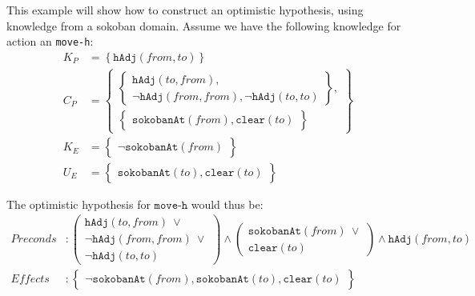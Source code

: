 \documentclass[../Master.tex]{subfiles}
\begin{document}
	\begin{example}
		This example will show how to construct an optimistic hypothesis, using knowledge from a sokoban domain.
		Assume we have the following knowledge for action an \texttt{move-h}:
		 	\begin{equation*}
			 	\begin{split}
				 	K_P & = \left\{\texttt{hAdj}(from, to) \right\} \\
					C_P& =	\left\{
							\begin{gathered}
								\left\{
								\begin{gathered}
									\texttt{hAdj}(to, from), \\
									\neg\texttt{hAdj}(from, from), \neg\texttt{hAdj}(to, to)
								\end{gathered}
								\right\},	\\ \left\{
								\begin{gathered}
									\texttt{sokobanAt}(from), \texttt{clear}(to)
								\end{gathered}
								\right\}
							\end{gathered}
							\right\}
				 	\\
				 	K_E& =
						 	\left\{
						 	\begin{gathered}
							 	\neg\texttt{sokobanAt}(from)
						 	\end{gathered}
						 	\right\}
					\\
				 	U_E& =
					 	\left\{
					 	\begin{gathered}
						 	\texttt{sokobanAt}(to),
						 	\texttt{clear}(to)
					 	\end{gathered}
					 	\right\}
				\end{split}
		 	\end{equation*}

		The optimistic hypothesis for $\texttt{move-h}$ would thus be:
			\begin{equation*}
				\begin{split}
					Preconds& :\left(
									 \begin{gathered}
									   \texttt{hAdj}(to, from) ~ \lor \\
									  \neg\texttt{hAdj}(from, from) ~ \lor \\ \neg\texttt{hAdj}(to, to)
									 \end{gathered}
								  \right) \land
								  \left(
									  \begin{gathered}
										  \texttt{sokobanAt}(from) ~ \lor \\ \texttt{clear}(to)
									  \end{gathered}
								  \right) \land \texttt{hAdj}(from, to) \\
					Effects &: 	\left\{
									\begin{gathered}
										\neg\texttt{sokobanAt}(from),
										\texttt{sokobanAt}(to),
										\texttt{clear}(to)
									\end{gathered}
								\right\}
				\end{split}
			\end{equation*}
	\end{example}
\end{document}
